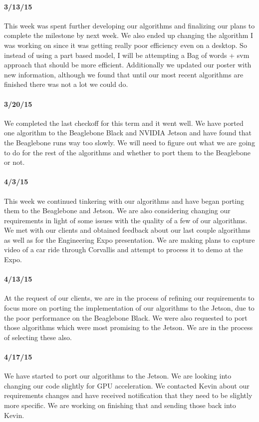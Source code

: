 \documentclass[letterpaper,10pt,titlepage]{article}
\begin{document}
    \paragraph*{3/13/15}
    This week was spent further developing our algorithms and finalizing our 
    plans to complete the milestone by next week. We also ended up changing the
    algorithm I was working on since it was getting really poor efficiency even
    on a desktop. So instead of using a part based model, I will be attempting
    a Bag of words + svm approach that should be more efficient. Additionally
    we updated our poster with new information, although we found that until 
    our most recent algorithms are finished there was not a lot we could do.
    \paragraph*{3/20/15}
    We completed the last checkoff for this term and it went well. We have 
    ported one algorithm to the Beaglebone Black and NVIDIA Jetson and have 
    found that the Beaglebone runs way too slowly. We will need to figure out
    what we are going to do for the rest of the algorithms and whether to port 
    them to the Beaglebone or not. 
    \paragraph*{4/3/15}
    This week we continued tinkering with our algorithms and have began porting
    them to the Beaglebone and Jetson. We are also considering changing our
    requirements in light of some issues with the quality of a few of our 
    algorithms. We met with our clients and obtained feedback about our last 
    couple algorithms as well as for the Engineering Expo presentation. We are
    making plans to capture video of a car ride through Corvallis and attempt 
    to process it to demo at the Expo.
    \paragraph*{4/13/15}
    At the request of our clients, we are in the process of refining our 
    requirements to focus more on porting the implementation of our algorithms
    to the Jetson, due to the poor performance on the Beaglebone Black. We 
    were also requested to port those algorithms which were most promising to 
    the Jetson. We are in the process of selecting these also. 
    \paragraph*{4/17/15}
    We have started to port our algorithms to the Jetson. We are looking into 
    changing our code slightly for GPU acceleration. We contacted Kevin about
    our requirements changes and have received notification that they need
    to be slightly more specific. We are working on finishing that and sending
    those back into Kevin.
\end{document}
